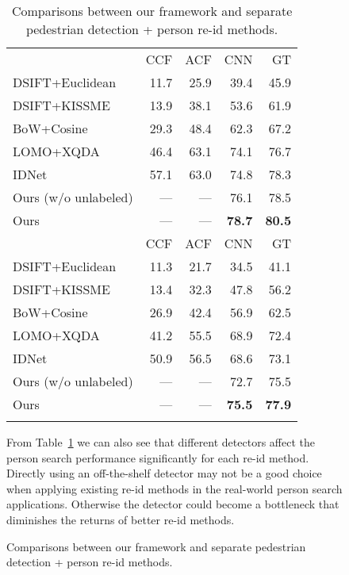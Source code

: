 \documentclass[10pt,twocolumn,letterpaper]{article}
\begin{document}
\begin{figure}[t]
\begin{center}
\setlength{\tabcolsep}{8pt}
\begin{table}
\small
\begin{center}
\begin{tabular}{lrrrr}
\hline\noalign{\smallskip}
\noalign{\smallskip}
\multicolumn{1}{c}{CMC top-1 (\%)} & CCF & ACF & CNN & GT \\
\noalign{\smallskip}\hline\hline\noalign{\smallskip}
DSIFT+Euclidean & 11.7 & 25.9 & 39.4 & 45.9 \\
DSIFT+KISSME    & 13.9 & 38.1 & 53.6 & 61.9 \\
BoW+Cosine      & 29.3 & 48.4 & 62.3 & 67.2 \\
LOMO+XQDA       & 46.4 & 63.1 & 74.1 & 76.7 \\
IDNet           & 57.1 & 63.0 & 74.8 & 78.3 \\
\hline\noalign{\smallskip}
Ours (w/o unlabeled)   & --- & --- & 76.1 & 78.5 \\
Ours                   & --- & --- & \textbf{78.7} & \textbf{80.5} \\
\hline\noalign{\smallskip}
\noalign{\smallskip}
\multicolumn{1}{c}{mAP (\%)} & CCF & ACF & CNN & GT \\
\noalign{\smallskip}\hline\hline\noalign{\smallskip}
DSIFT+Euclidean & 11.3 & 21.7 & 34.5 & 41.1 \\
DSIFT+KISSME    & 13.4 & 32.3 & 47.8 & 56.2 \\
BoW+Cosine      & 26.9 & 42.4 & 56.9 & 62.5 \\
LOMO+XQDA       & 41.2 & 55.5 & 68.9 & 72.4 \\
IDNet           & 50.9 & 56.5 & 68.6 & 73.1 \\
\hline\noalign{\smallskip}
Ours (w/o unlabeled)   & --- & --- & 72.7 & 75.5 \\
Ours                   & --- & --- & \textbf{75.5} & \textbf{77.9} \\
\hline\noalign{\smallskip}
\end{tabular}
\end{center}
\vspace{-3ex}
\caption{Comparisons between our framework and separate pedestrian detection + person re-id methods. }
\vspace{-1ex}
\label{tab:results}
\end{table}
\setlength{\tabcolsep}{6pt}

From Table~\ref{tab:results} we can also see that different detectors affect the person search performance significantly for each re-id method. Directly using an off-the-shelf detector may not be a good choice when applying existing re-id methods in the real-world person search applications. Otherwise the detector could become a bottleneck that diminishes the returns of better re-id methods.


\end{center}
\end{figure}
\end{document}
